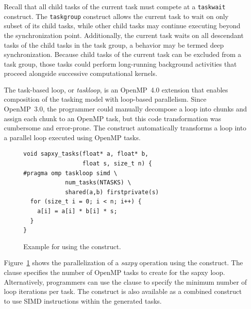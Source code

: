 


Recall that all child tasks of the current task must compete at a \texttt{taskwait} construct.  The \texttt{taskgroup} construct allows the current task to wait on only subset of its child tasks, while other child tasks may continue executing beyond the synchronization point.  Additionally, the current task waits on all descendant tasks of the child tasks in the task group, a behavior may be termed deep synchronization.  Because child tasks of the current task can be excluded from a task group, those tasks could perform long-running background activities that proceed alongside successive computational kernels.






\label{sec:Taskloop}

The task-based loop, or \emph{taskloop}, is an OpenMP~4.0 extension that enables composition of the tasking model with loop-based parallelism.
Since OpenMP~3.0, the programmer could manually decompose a loop into chunks and assign each chunk to an OpenMP task, but this code transformation was cumbersome and error-prone.
The  construct automatically transforms a loop into a parallel loop executed using OpenMP tasks.

\begin{figure}
\begin{verbatim}
void sapxy_tasks(float* a, float* b,
                 float s, size_t n) {
#pragma omp taskloop simd \
            num_tasks(NTASKS) \
            shared(a,b) firstprivate(s)
  for (size_t i = 0; i < n; i++) {
    a[i] = a[i] * b[i] * s;
  }
}
\end{verbatim}
\caption{Example for using the  construct.\label{fig:TaskloopExample}}
\end{figure}

Figure~\ref{fig:TaskloopExample} shows the parallelization of a \emph{saxpy} operation using the  construct.
The  clause specifies the number of OpenMP tasks to create for the sapxy loop.
Alternatively, programmers can use the \code{grainsize} clause to specify the minimum number of loop iterations per task.
The \code{taskloop} construct is also available as a combined construct to use SIMD instructions within the generated tasks.
